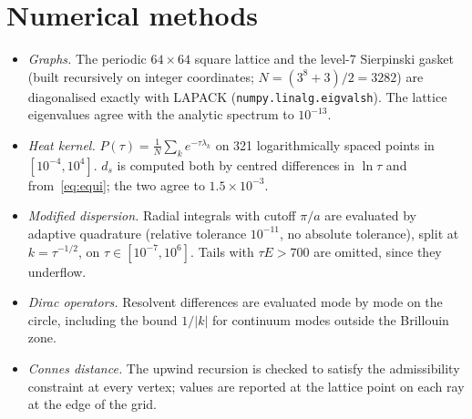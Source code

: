 \documentclass[11pt]{article}
\theoremstyle{remark}\newtheorem*{remark}{Remark}
\begin{document}
\section{Numerical methods}
\begin{itemize}
\item \emph{Graphs.} The periodic $64\times64$ square lattice and the level-7 Sierpinski gasket (built recursively
on integer coordinates; $N=(3^{8}+3)/2=3282$) are diagonalised exactly with LAPACK (\texttt{numpy.linalg.eigvalsh}).
The lattice eigenvalues agree with the analytic spectrum to $10^{-13}$.
\item \emph{Heat kernel.} $P(\tau)=\frac1N\sum_ke^{-\tau\lambda_k}$ on 321 logarithmically spaced points in $[10^{-4},10^4]$.
$d_s$ is computed both by centred differences in $\ln\tau$ and from~\eqref{eq:equi}; the two agree to $1.5\times10^{-3}$.
\item \emph{Modified dispersion.} Radial integrals with cutoff $\pi/a$ are evaluated by adaptive quadrature
(relative tolerance $10^{-11}$, no absolute tolerance), split at $k=\tau^{-1/2}$, on $\tau\in[10^{-7},10^6]$. Tails with
$\tau E>700$ are omitted, since they underflow.
\item \emph{Dirac operators.} Resolvent differences are evaluated mode by mode on the circle, including the bound
$1/|k|$ for continuum modes outside the Brillouin zone.
\item \emph{Connes distance.} The upwind recursion is checked to satisfy the admissibility constraint at every
vertex; values are reported at the lattice point on each ray at the edge of the grid.
\end{itemize}
\end{document}
